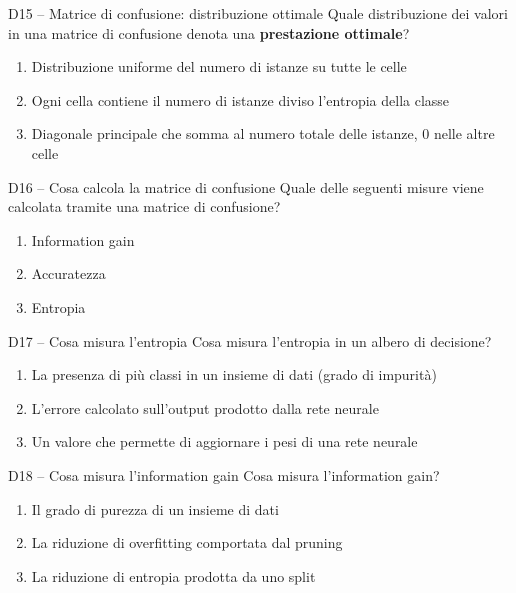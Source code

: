 \documentclass[12pt,a4paper]{article}
\begin{document}
\begin{domanda}{D15 -- Matrice di confusione: distribuzione ottimale}
Quale distribuzione dei valori in una matrice di confusione denota una \textbf{prestazione ottimale}?
\begin{enumerate}[label=\alph*.]
  \item Distribuzione uniforme del numero di istanze su tutte le celle
  \item Ogni cella contiene il numero di istanze diviso l'entropia della classe
  \item Diagonale principale che somma al numero totale delle istanze, 0 nelle altre celle
\end{enumerate}
\end{domanda}

\begin{domanda}{D16 -- Cosa calcola la matrice di confusione}
Quale delle seguenti misure viene calcolata tramite una matrice di confusione?
\begin{enumerate}[label=\alph*.]
  \item Information gain
  \item Accuratezza
  \item Entropia
\end{enumerate}
\end{domanda}

\begin{domanda}{D17 -- Cosa misura l'entropia}
Cosa misura l'entropia in un albero di decisione?
\begin{enumerate}[label=\alph*.]
  \item La presenza di più classi in un insieme di dati (grado di impurità)
  \item L'errore calcolato sull'output prodotto dalla rete neurale
  \item Un valore che permette di aggiornare i pesi di una rete neurale
\end{enumerate}
\end{domanda}

\begin{domanda}{D18 -- Cosa misura l'information gain}
Cosa misura l'information gain?
\begin{enumerate}[label=\alph*.]
  \item Il grado di purezza di un insieme di dati
  \item La riduzione di overfitting comportata dal pruning
  \item La riduzione di entropia prodotta da uno split
\end{enumerate}
\end{domanda}
\end{document}

